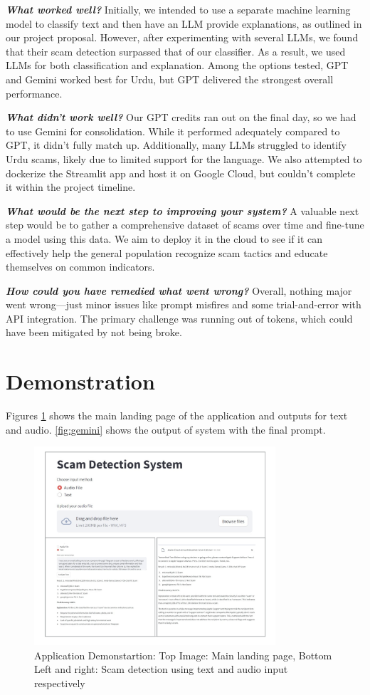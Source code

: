 \documentclass[11pt]{article}
\begin{document}
{\textbf{\textit{{What worked well?}}} Initially, we intended to use a separate machine learning model to classify text and then have an LLM provide explanations, as outlined in our project proposal. However, after experimenting with several LLMs, we found that their scam detection surpassed that of our classifier. As a result, we used LLMs for both classification and explanation. Among the options tested, GPT and Gemini worked best for Urdu, but GPT delivered the strongest overall performance.

{\textbf{\textit{{What didn’t work well?}}} Our GPT credits ran out on the final day, so we had to use Gemini for consolidation. While it performed adequately compared to GPT, it didn't fully match up. Additionally, many LLMs struggled to identify Urdu scams, likely due to limited support for the language. We also attempted to dockerize the Streamlit app and host it on Google Cloud, but couldn't complete it within the project timeline.

{\textbf{\textit{What would be the next step to improving your system?}}} A valuable next step would be to gather a comprehensive dataset of scams over time and fine-tune a model using this data. We aim to deploy it in the cloud to see if it can effectively help the general population recognize scam tactics and educate themselves on common indicators.

{\textbf{\textit{How could you have remedied what went wrong?}} Overall, nothing major went wrong—just minor issues like prompt misfires and some trial-and-error with API integration. The primary challenge was running out of tokens, which could have been mitigated by not being broke.

\section{Demonstration}
Figures \ref{fig:demo} shows the main landing page of the application and outputs for text and audio. \ref{fig:gemini} shows the output of system with the final prompt. 

\begin{figure}[ht]
    \centering
    \includegraphics[width=0.8\textwidth]{demo.png} 
    \caption{Application Demonstartion: Top Image: Main landing page,
    Bottom Left and right: Scam detection using text and audio input respectively }
    \label{fig:demo}
\end{figure}

}}}
\end{document}
